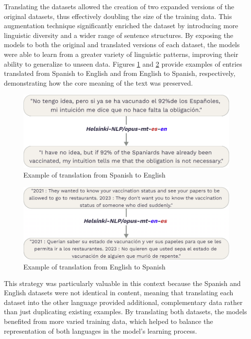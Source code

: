 \documentclass{Configuration_Files/PoliMi3i_thesis}
\begin{document}
Translating the datasets allowed the creation of two expanded versions of the original datasets, thus effectively doubling the size of the training data. This augmentation technique significantly enriched the dataset by introducing more linguistic diversity and a wider range of sentence structures. By exposing the models to both the original and translated versions of each dataset, the models were able to learn from a greater variety of linguistic patterns, improving their ability to generalize to unseen data. Figures \ref{fig:trad_es_en} and \ref{fig:trad_en_es} provide examples of entries translated from Spanish to English and from English to Spanish, respectively, demonstrating how the core meaning of the text was preserved.

\begin{figure}[h!]
 \centering
 \includegraphics[width=0.75\linewidth, height=0.18\textheight]{Images/trad_es_en.png}
 \caption{\small Example of translation from Spanish to English}
 \label{fig:trad_es_en}
\end{figure}
\FloatBarrier

\begin{figure}[h!]
 \centering
 \includegraphics[width=0.78\linewidth, height=0.2\textheight]{Images/trad_en_es.png}
 \caption{\small Example of translation from English to Spanish}
 \label{fig:trad_en_es}
\end{figure}
\FloatBarrier

This strategy was particularly valuable in this context because the Spanish and English datasets were not identical in content, meaning that translating each dataset into the other language provided additional, complementary data rather than just duplicating existing examples. By translating both datasets, the models benefited from more varied training data, which helped to balance the representation of both languages in the model’s learning process.
\end{document}
